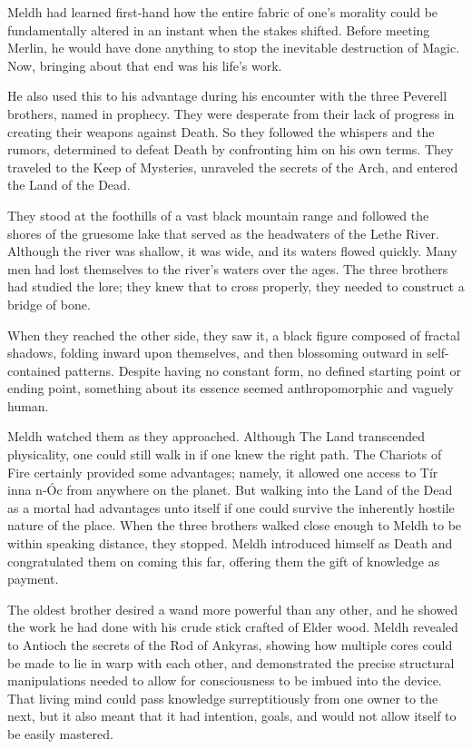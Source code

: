 Meldh had learned first-hand how the entire fabric of one’s morality could be fundamentally altered in an instant when the stakes shifted. Before meeting Merlin, he would have done anything to stop the inevitable destruction of Magic. Now, bringing about that end was his life’s work.

He also used this to his advantage during his encounter with the three Peverell brothers, named in prophecy. They were desperate from their lack of progress in creating their weapons against Death. So they followed the whispers and the rumors, determined to defeat Death by confronting him on his own terms. They traveled to the Keep of Mysteries, unraveled the secrets of the Arch, and entered the Land of the Dead.

They stood at the foothills of a vast black mountain range and followed the shores of the gruesome lake that served as the headwaters of the Lethe River. Although the river was shallow, it was wide, and its waters flowed quickly. Many men had lost themselves to the river’s waters over the ages. The three brothers had studied the lore; they knew that to cross properly, they needed to construct a bridge of bone.

When they reached the other side, they saw it, a black figure composed of fractal shadows, folding inward upon themselves, and then blossoming outward in self-contained patterns. Despite having no constant form, no defined starting point or ending point, something about its essence seemed anthropomorphic and vaguely human.

Meldh watched them as they approached. Although The Land transcended physicality, one could still walk in if one knew the right path. The Chariots of Fire certainly provided some advantages; namely, it allowed one access to Tír inna n-Óc from anywhere on the planet. But walking into the Land of the Dead as a mortal had advantages unto itself if one could survive the inherently hostile nature of the place. When the three brothers walked close enough to Meldh to be within speaking distance, they stopped. Meldh introduced himself as Death and congratulated them on coming this far, offering them the gift of knowledge as payment.

The oldest brother desired a wand more powerful than any other, and he showed the work he had done with his crude stick crafted of Elder wood. Meldh revealed to Antioch the secrets of the Rod of Ankyras, showing how multiple cores could be made to lie in warp with each other, and demonstrated the precise structural manipulations needed to allow for consciousness to be imbued into the device. That living mind could pass knowledge surreptitiously from one owner to the next, but it also meant that it had intention, goals, and would not allow itself to be easily mastered.

